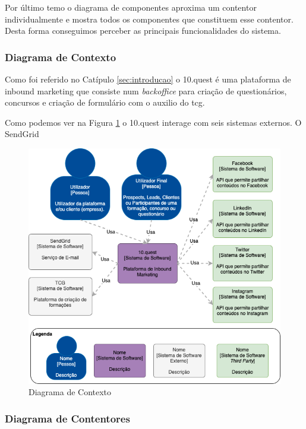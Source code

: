 Por último temo o diagrama de componentes aproxima um contentor individualmente e mostra todos os componentes que constituem esse contentor. Desta forma conseguimos perceber as principais funcionalidades do sistema. 


\subsubsection{Diagrama de Contexto}

Como foi referido no Catípulo \ref{sec:introducao} o 10.quest é uma plataforma de inbound marketing que consiste num \textit{backoffice} para criação de questionários, concursos e criação de formulário com o auxilio do \acrshort{tcg}.

Como podemos ver na Figura \ref{fig:arq-contexto} o 10.quest interage com seis sistemas externos. O SendGrid

\newpage

\begin{figure}[ht!]
	\begin{center}
		\includegraphics[width=1\textwidth]{img/arq/diagrama-contexto}
		\caption{Diagrama de Contexto}
		\label{fig:arq-contexto}
	\end{center}
\end{figure}

\subsubsection{Diagrama de Contentores}

